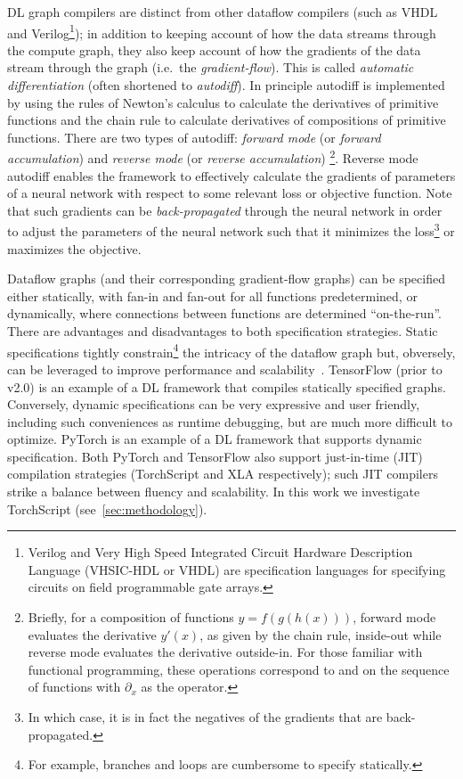 DL graph compilers are distinct from other dataflow compilers (such as VHDL and Verilog\footnote{Verilog and Very High Speed Integrated Circuit Hardware Description Language (VHSIC-HDL or VHDL) are specification languages for specifying circuits on field programmable gate arrays.}); in addition to keeping account of how the data streams through the compute graph, they also keep account of how the gradients of the data stream through the graph (i.e.\ the \textit{gradient-flow}).
This is called \textit{automatic differentiation} (often shortened to \textit{autodiff}).
In principle autodiff is implemented by using the rules of Newton's calculus to calculate the derivatives of primitive functions and the chain rule to calculate derivatives of compositions of primitive functions.
There are two types of autodiff: \textit{forward mode} (or \textit{forward accumulation}) and \textit{reverse mode} (or \textit{reverse accumulation})%
\footnote{Briefly, for a composition of functions $y=f(g(h(x)))$, forward mode evaluates the derivative $y'(x)$, as given by the chain rule, inside-out while reverse mode evaluates the derivative outside-in. For those familiar with functional programming, these operations correspond to  and  on the sequence of functions with $\partial_x$ as the operator.}.
Reverse mode autodiff enables the framework to effectively calculate the gradients of parameters of a neural network with respect to some relevant loss or objective function.
Note that such gradients can be \textit{back-propagated} through the neural network in order to adjust the parameters of the neural network such that it minimizes the loss\footnote{In which case, it is in fact the negatives of the gradients that are back-propagated.} or maximizes the objective.

Dataflow graphs (and their corresponding gradient-flow graphs) can be specified either statically, with fan-in and fan-out for all functions predetermined, or dynamically, where connections between functions are determined ``on-the-run''.
There are advantages and disadvantages to both specification strategies.
Static specifications tightly constrain\footnote{For example, branches and loops are cumbersome to specify statically.} the intricacy of the dataflow graph but, obversely, can be leveraged to improve performance and scalability~\cite{le2019tflms,Pradelle2017PolyhedralOO}.
TensorFlow (prior to v2.0) is an example of a DL framework that compiles statically specified graphs.
Conversely, dynamic specifications can be very expressive and user friendly, including such conveniences as runtime debugging, but are much more difficult to optimize.
PyTorch is an example of a DL framework that supports dynamic specification.
Both PyTorch and TensorFlow also support just-in-time (JIT) compilation strategies (TorchScript and XLA respectively);
such JIT compilers strike a balance between fluency and scalability.
In this work we investigate TorchScript (see~\cref{sec:methodology}).

